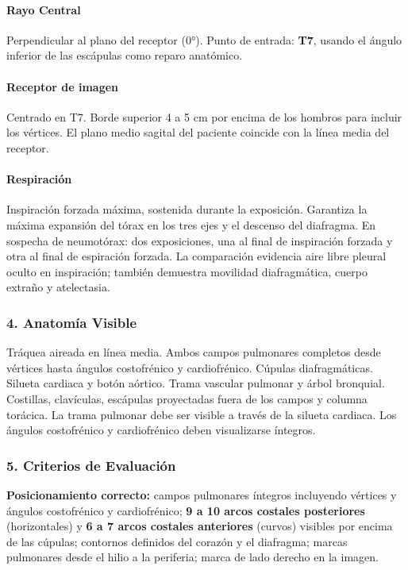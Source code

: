 \documentclass[9pt,a4paper,twocolumn,twoside]{tau-class/tau}
\begin{document}
	\paragraph{Rayo Central}
	Perpendicular al plano del receptor (0°). Punto de entrada: \textbf{T7}, usando el ángulo inferior de las escápulas como reparo anatómico.
	
	\paragraph{Receptor de imagen}
	Centrado en T7. Borde superior 4 a 5 cm por encima de los hombros para incluir los vértices. El plano medio sagital del paciente coincide con la línea media del receptor.
	
	\paragraph{Respiración}
	Inspiración forzada máxima, sostenida durante la exposición. Garantiza la máxima expansión del tórax en los tres ejes y el descenso del diafragma. En sospecha de neumotórax: dos exposiciones, una al final de inspiración forzada y otra al final de espiración forzada. La comparación evidencia aire libre pleural oculto en inspiración; también demuestra movilidad diafragmática, cuerpo extraño y atelectasia.
	
	\subsubsection*{4. Anatomía Visible}
	
	Tráquea aireada en línea media. Ambos campos pulmonares completos desde vértices hasta ángulos costofrénico y cardiofrénico. Cúpulas diafragmáticas. Silueta cardiaca y botón aórtico. Trama vascular pulmonar y árbol bronquial. Costillas, clavículas, escápulas proyectadas fuera de los campos y columna torácica. La trama pulmonar debe ser visible a través de la silueta cardiaca. Los ángulos costofrénico y cardiofrénico deben visualizarse íntegros.
	
	\subsubsection*{5. Criterios de Evaluación}
	
	\textbf{Posicionamiento correcto:} campos pulmonares íntegros incluyendo vértices y ángulos costofrénico y cardiofrénico; \textbf{9 a 10 arcos costales posteriores} (horizontales) y \textbf{6 a 7 arcos costales anteriores} (curvos) visibles por encima de las cúpulas; contornos definidos del corazón y el diafragma; marcas pulmonares desde el hilio a la periferia; marca de lado derecho en la imagen.
	
\end{document}
